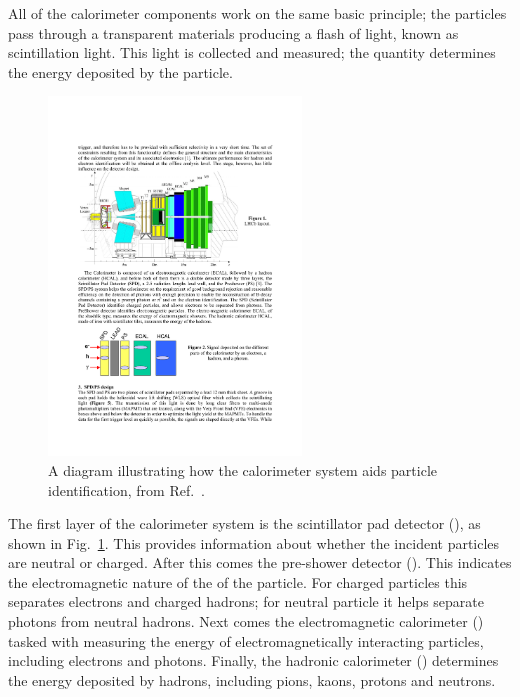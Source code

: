 All of the calorimeter components work on the same basic principle; the particles pass through a transparent materials producing a flash of light, known as scintillation light. This light is collected and measured; the quantity determines the energy deposited by the particle.  



\begin{figure}[!h]
    \centering
    \includegraphics[width=0.6\textwidth]{figs/Detector/calo_layout.pdf}
    \caption{A diagram illustrating how the calorimeter system aids particle identification, from Ref.~\cite{1742-6596-293-1-012059}.}
    \label{fig:Dec_calo_layout}   
\end{figure}


The first layer of the calorimeter system is the scintillator pad detector (\spd), as shown in Fig.~\ref{fig:Dec_calo_layout}. This provides information about whether the incident particles are neutral or charged. After this comes the pre-shower detector (\presh). This indicates the electromagnetic nature of the of the particle. For charged particles this separates electrons and charged hadrons; for neutral particle it helps separate photons from neutral hadrons. Next comes the electromagnetic calorimeter (\ecal) tasked with measuring the energy of electromagnetically interacting particles, including electrons and photons. Finally, the hadronic calorimeter (\hcal) determines the energy deposited by hadrons, including pions, kaons, protons and neutrons. 

